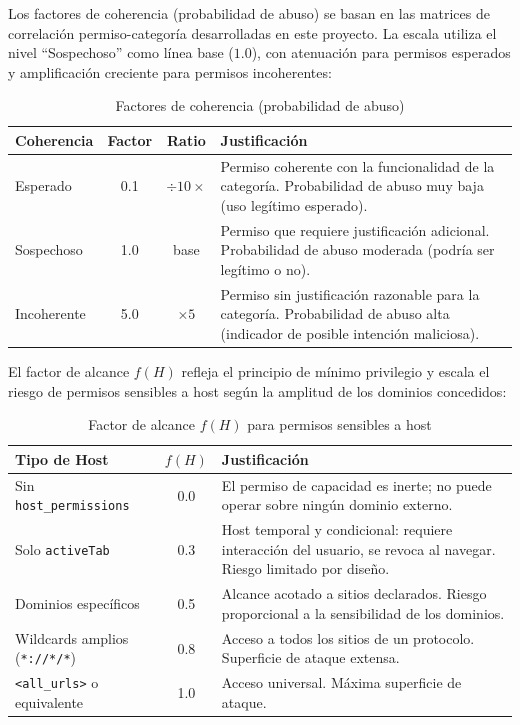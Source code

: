\documentclass[12pt,oneside]{report}
\begin{document}
Los factores de coherencia (probabilidad de abuso) se basan en las matrices de correlación permiso-categoría desarrolladas en este proyecto. La escala utiliza el nivel ``Sospechoso'' como línea base ($1.0$), con atenuación para permisos esperados y amplificación creciente para permisos incoherentes:

\begin{table}[!htbp]
\centering
\begin{tabular}{|l|c|c|p{5.5cm}|}
\hline
\textbf{Coherencia} & \textbf{Factor} & \textbf{Ratio} & \textbf{Justificación} \\
\hline
Esperado & 0.1 & $\div 10\times$ & Permiso coherente con la funcionalidad de la categoría. Probabilidad de abuso muy baja (uso legítimo esperado). \\
Sospechoso & 1.0 & base & Permiso que requiere justificación adicional. Probabilidad de abuso moderada (podría ser legítimo o no). \\
Incoherente & 5.0 & $\times 5$ & Permiso sin justificación razonable para la categoría. Probabilidad de abuso alta (indicador de posible intención maliciosa). \\
\hline
\end{tabular}
\caption{Factores de coherencia (probabilidad de abuso)}
\label{tab:coherence_factors}
\end{table}

El factor de alcance $f(H)$ refleja el principio de mínimo privilegio y escala el riesgo de permisos sensibles a host según la amplitud de los dominios concedidos:

\begin{table}[!htbp]
\centering
\begin{tabular}{|l|c|p{7cm}|}
\hline
\textbf{Tipo de Host} & $f(H)$ & \textbf{Justificación} \\
\hline
Sin \texttt{host\_permissions} & 0.0 & El permiso de capacidad es inerte; no puede operar sobre ningún dominio externo. \\
Solo \texttt{activeTab} & 0.3 & Host temporal y condicional: requiere interacción del usuario, se revoca al navegar. Riesgo limitado por diseño. \\
Dominios específicos & 0.5 & Alcance acotado a sitios declarados. Riesgo proporcional a la sensibilidad de los dominios. \\
Wildcards amplios (\texttt{*://*/*}) & 0.8 & Acceso a todos los sitios de un protocolo. Superficie de ataque extensa. \\
\texttt{<all\_urls>} o equivalente & 1.0 & Acceso universal. Máxima superficie de ataque. \\
\hline
\end{tabular}
\caption{Factor de alcance $f(H)$ para permisos sensibles a host}
\label{tab:host_factor}
\end{table}
\end{document}
